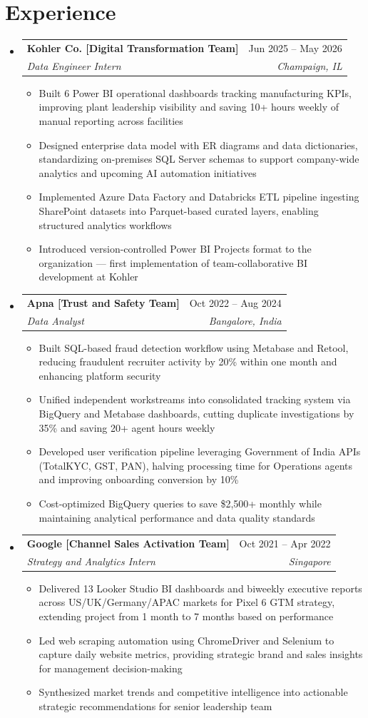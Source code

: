 \documentclass[letterpaper,11pt]{article}
\makeatletter
\newcommand{\resumeSubheading}[4]{
  \vspace{0pt}\item
    \begin{tabular*}{\textwidth}{l@{\extracolsep{\fill}}r}
      \textbf{#1} & #2 \\
      \textit{#3} & \textit{#4} \\ 
    \end{tabular*}\vspace{-6pt}
}
\newcommand{\resumeSubHeadingListStart}{\begin{itemize}[leftmargin=0pt,label={},itemsep=-2pt]}
\newcommand{\resumeSubHeadingListEnd}{\end{itemize}}
\newcommand{\resumeItemListStart}{\begin{itemize}[leftmargin=12pt, nosep, topsep=2pt]}
\newcommand{\resumeItemListEnd}{\end{itemize}}
\makeatother
\begin{document}
\section{Experience}
  \resumeSubHeadingListStart
{}
\resumeSubheading
      {Kohler Co. [Digital Transformation Team]}{Jun 2025 -- May 2026}
      {Data Engineer Intern}{Champaign, IL}
      \resumeItemListStart
        \item {Built 6 Power BI operational dashboards tracking manufacturing KPIs, improving plant leadership visibility and saving 10+ hours weekly of manual reporting across facilities}
        \item {Designed enterprise data model with ER diagrams and data dictionaries, standardizing on-premises SQL Server schemas to support company-wide analytics and upcoming AI automation initiatives}
        \item {Implemented Azure Data Factory and Databricks ETL pipeline ingesting SharePoint datasets into Parquet-based curated layers, enabling structured analytics workflows}
        \item {Introduced version-controlled Power BI Projects format to the organization — first implementation of team-collaborative BI development at Kohler}
      \resumeItemListEnd
{}
\resumeSubheading
      {Apna [Trust and Safety Team]}{Oct 2022 -- Aug 2024}
      {Data Analyst}{Bangalore, India}
      \resumeItemListStart
        \item {Built SQL-based fraud detection workflow using Metabase and Retool, reducing fraudulent recruiter activity by 20\% within one month and enhancing platform security}
        \item {Unified independent workstreams into consolidated tracking system via BigQuery and Metabase dashboards, cutting duplicate investigations by 35\% and saving 20+ agent hours weekly}
        \item {Developed user verification pipeline leveraging Government of India APIs (TotalKYC, GST, PAN), halving processing time for Operations agents and improving onboarding conversion by 10\%}
        \item {Cost-optimized BigQuery queries to save \$2,500+ monthly while maintaining analytical performance and data quality standards}
      \resumeItemListEnd
{}
\resumeSubheading
      {Google [Channel Sales Activation Team]}{Oct 2021 -- Apr 2022}
      {Strategy and Analytics Intern}{Singapore}
      \resumeItemListStart
        \item {Delivered 13 Looker Studio BI dashboards and biweekly executive reports across US/UK/Germany/APAC markets for Pixel 6 GTM strategy, extending project from 1 month to 7 months based on performance}
        \item {Led web scraping automation using ChromeDriver and Selenium to capture daily website metrics, providing strategic brand and sales insights for management decision-making}
        \item {Synthesized market trends and competitive intelligence into actionable strategic recommendations for senior leadership team}
      \resumeItemListEnd
  \resumeSubHeadingListEnd
\end{document}
